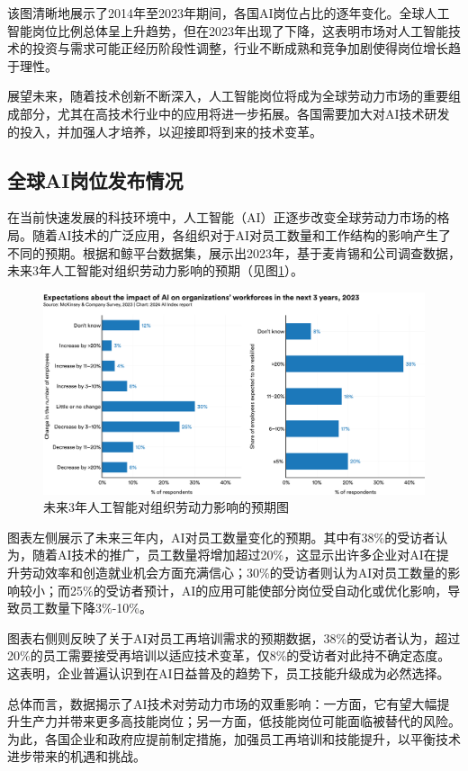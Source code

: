 该图清晰地展示了2014年至2023年期间，各国AI岗位占比的逐年变化。全球人工智能岗位比例总体呈上升趋势，但在2023年出现了下降，这表明市场对人工智能技术的投资与需求可能正经历阶段性调整，行业不断成熟和竞争加剧使得岗位增长趋于理性。

展望未来，随着技术创新不断深入，人工智能岗位将成为全球劳动力市场的重要组成部分，尤其在高技术行业中的应用将进一步拓展。各国需要加大对AI技术研发的投入，并加强人才培养，以迎接即将到来的技术变革。\cite{wang2024impact}

\subsection{全球AI岗位发布情况}
在当前快速发展的科技环境中，人工智能（AI）正逐步改变全球劳动力市场的格局。随着AI技术的广泛应用，各组织对于AI对员工数量和工作结构的影响产生了不同的预期。根据和鲸平台数据集，展示出2023年，基于麦肯锡和公司调查数据，未来3年人工智能对组织劳动力影响的预期（见图\ref{未来3年人工智能对组织劳动力影响的预期图}）。
\begin{figure}[H]
    \centering
    \includegraphics[width=0.7\linewidth]{figure/18未来3年人工智能对组织劳动力影响的预期图.png}
    \caption{未来3年人工智能对组织劳动力影响的预期图}
    \label{未来3年人工智能对组织劳动力影响的预期图}
\end{figure}

图表左侧展示了未来三年内，AI对员工数量变化的预期。其中有38\%的受访者认为，随着AI技术的推广，员工数量将增加超过20\%，这显示出许多企业对AI在提升劳动效率和创造就业机会方面充满信心；30\%的受访者则认为AI对员工数量的影响较小；而25\%的受访者预计，AI的应用可能使部分岗位受自动化或优化影响，导致员工数量下降3\%-10\%。

图表右侧则反映了关于AI对员工再培训需求的预期数据，38\%的受访者认为，超过20\%的员工需要接受再培训以适应技术变革，仅8\%的受访者对此持不确定态度。这表明，企业普遍认识到在AI日益普及的趋势下，员工技能升级成为必然选择。

总体而言，数据揭示了AI技术对劳动力市场的双重影响：一方面，它有望大幅提升生产力并带来更多高技能岗位；另一方面，低技能岗位可能面临被替代的风险。为此，各国企业和政府应提前制定措施，加强员工再培训和技能提升，以平衡技术进步带来的机遇和挑战。

